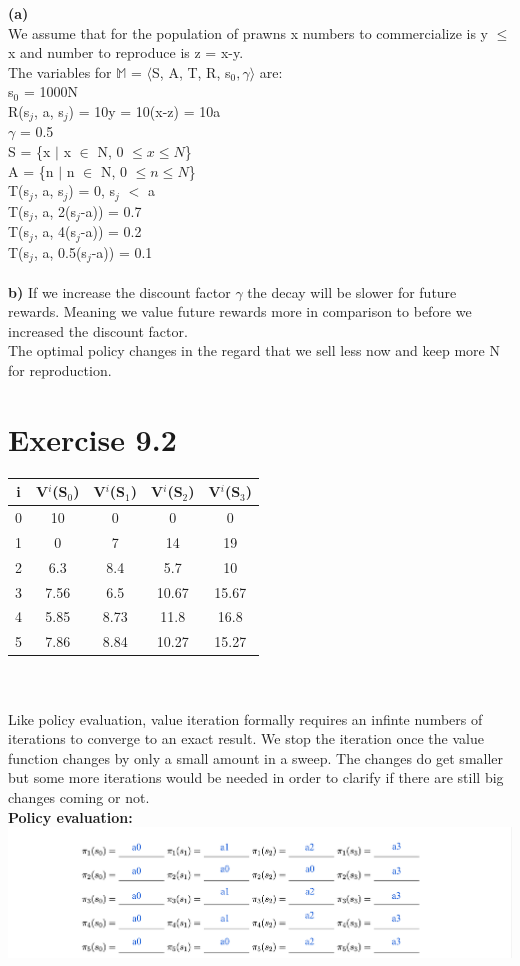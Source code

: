 \documentclass[12pt]{article}
\begin{document}
\textbf{(a)}\\
We assume that for the population of prawns x numbers to commercialize is y $\leq$ x and number to reproduce is z = x-y.\\
The variables for $\mathbb{M}$ = $\langle$S, A, T, R, s$_{0}, \gamma \rangle$ are:\\
s$_{0}$ = 1000N\\
R(s$_{j}$, a, s$_{j}$) = 10y = 10(x-z) = 10a\\
$\gamma$ = 0.5\\
S = \{x $\mid$ x $\in$ N, 0 $\leq x \leq N$\}\\
A = \{n $\mid$ n $\in$ N, 0 $\leq n \leq N$\}\\
T(s$_{j}$, a, s$_{j}$) = 0, s$_{j}$ $<$ a\\
T(s$_{j}$, a, 2(s$_{j}$-a)) = 0.7\\
T(s$_{j}$, a, 4(s$_{j}$-a)) = 0.2\\
T(s$_{j}$, a, 0.5(s$_{j}$-a)) = 0.1\\\\
\textbf{b)} If we increase the discount factor $\gamma$ the decay will be slower for future rewards. Meaning we value future rewards more in comparison to before we increased the discount factor.\\The optimal policy changes in the regard that we sell less now and keep more N for reproduction.

\section*{Exercise 9.2}
\begin{tabular}[h]{c|c|c|c|c}
i & V$^{i}$(S$_{0}$) & V$^{i}$(S$_{1}$) & V$^{i}$(S$_{2}$) & V$^{i}$(S$_{3}$)\\
\hline
0 & 10 & 0 & 0 & 0\\
\hline
1 & 0 & 7 & 14 & 19\\
\hline
2 & 6.3 & 8.4 & 5.7 & 10\\
\hline
3 & 7.56 & 6.5 & 10.67 & 15.67\\
\hline
4 & 5.85 & 8.73 & 11.8 & 16.8\\
\hline
5 & 7.86 & 8.84 & 10.27 & 15.27\\
\end{tabular}\\\\
Like policy evaluation, value iteration formally requires an infinte numbers of iterations to converge to an exact result. We stop the iteration once the value function changes by only a small amount in a sweep. The changes do get smaller but some more iterations would be needed in order to clarify if there are still big changes coming or not.\pagebreak\\
\textbf{Policy evaluation:}\\
\includegraphics[scale=0.3]{9_3}
\end{document}
